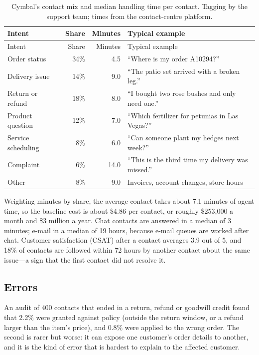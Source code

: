\begingroup
\small
\begin{longtable}{@{}lrrl@{}}
\caption{Cymbal's contact mix and median handling time per contact. Tagging by the support team; times from the contact-centre platform.}\label{tab:intents}\\
\toprule
\rowcolor{coHead} Intent & Share & Minutes & Typical example \\
\midrule
\endfirsthead
\toprule
\rowcolor{coHead} Intent & Share & Minutes & Typical example \\
\midrule
\endhead
Order status & 34\% & 4.5 & ``Where is my order A10294?'' \\
Delivery issue & 14\% & 9.0 & ``The patio set arrived with a broken leg.'' \\
Return or refund & 18\% & 8.0 & ``I bought two rose bushes and only need one.'' \\
Product question & 12\% & 7.0 & ``Which fertilizer for petunias in Las Vegas?'' \\
Service scheduling & 8\% & 6.0 & ``Can someone plant my hedges next week?'' \\
Complaint & 6\% & 14.0 & ``This is the third time my delivery was missed.'' \\
Other & 8\% & 9.0 & Invoices, account changes, store hours \\
\bottomrule
\end{longtable}
\endgroup

Weighting minutes by share, the average contact takes about 7.1 minutes of agent time, so the baseline cost is about \$4.86 per contact, or roughly \$253{,}000 a month and \$3 million a year. Chat contacts are answered in a median of 3 minutes; e-mail in a median of 19 hours, because e-mail queues are worked after chat. Customer satisfaction (CSAT) after a contact averages 3.9 out of 5, and 18\% of contacts are followed within 72 hours by another contact about the same issue---a sign that the first contact did not resolve it.

\subsection{Errors}

An audit of 400 contacts that ended in a return, refund or goodwill credit found that 2.2\% were granted against policy (outside the return window, or a refund larger than the item's price), and 0.8\% were applied to the wrong order. The second is rarer but worse: it can expose one customer's order details to another, and it is the kind of error that is hardest to explain to the affected customer.

